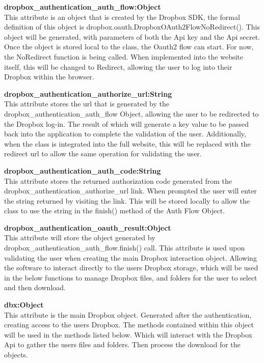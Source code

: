 \textbf{dropbox\_authentication\_auth\_flow:Object} \\
    This attribute is an object that is created by the Dropbox SDK, the formal definition of this object is 
    dropbox.oauth.DropboxOAuth2FlowNoRedirect(). This object will be generated, with parameters of both the Api key
    and the Api secret. Once the object is stored local to the class, the Oauth2 flow can start. For now, the NoRedirect
    function is being called. When implemented into the website itself, this will be changed to Redirect, allowing the 
    user to log into their Dropbox within the browser. 

\textbf{dropbox\_authentication\_authorize\_url:String} \\
    This attribute stores the url that is generated by the dropbox\_authentication\_auth\_flow Object, allowing the user
    to be redirected to the Dropbox log-in. The result of which will generate a key value to be passed back into the application
    to complete the validation of the user. Additionally, when the class is integrated into the full website, this will be replaced
    with the redirect url to allow the same operation for validating the user.

\textbf{dropbox\_authentication\_auth\_code:String} \\
    This attribute stores the returned authorization code generated from the dropbox\_authentication\_authorize\_url link. When
    prompted the user will enter the string returned by visiting the link. This will be stored locally to allow the class to use the
    string in the finish() method of the Auth Flow Object. 

\textbf{dropbox\_authentication\_oauth\_result:Object} \\
    This attribute will store the object generated by dropbox\_authentication\_auth\_flow.finish() call. This attribute is used upon validating
    the user when creating the main Dropbox interaction object. Allowing the software to interact directly to the users Dropbox storage, 
    which will be used in the below functions to manage Dropbox files, and folders for the user to select and then download. 

\textbf{dbx:Object} \\
    This attribute is the main Dropbox object. Generated after the authentication, creating access to the users Dropbox. The methods contained 
    within this object will be used in the methods listed below. Which will interact with the Dropbox Api to gather the users files and folders.
    Then process the download for the objects. 

